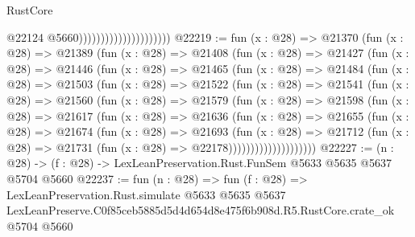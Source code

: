 \begin{lexlean}{RustCore}
\begin{coremodule}
                                              @22124
                                              @5660)))))))))))))))))))))
@22219 := fun (x : @28) =>
  @21370
    (fun (x : @28) =>
    @21389
      (fun (x : @28) =>
      @21408
        (fun (x : @28) =>
        @21427
          (fun (x : @28) =>
          @21446
            (fun (x : @28) =>
            @21465
              (fun (x : @28) =>
              @21484
                (fun (x : @28) =>
                @21503
                  (fun (x : @28) =>
                  @21522
                    (fun (x : @28) =>
                    @21541
                      (fun (x : @28) =>
                      @21560
                        (fun (x : @28) =>
                        @21579
                          (fun (x : @28) =>
                          @21598
                            (fun (x : @28) =>
                            @21617
                              (fun (x : @28) =>
                              @21636
                                (fun (x : @28) =>
                                @21655
                                  (fun (x : @28) =>
                                  @21674
                                    (fun (x : @28) =>
                                    @21693
                                      (fun (x : @28) =>
                                      @21712
                                        (fun (x : @28) =>
                                        @21731 (fun (x : @28) => @22178))))))))))))))))))))
@22227 := (n : @28) -> (f : @28) -> LexLeanPreservation.Rust.FunSem @5633 @5635 @5637 @5704 @5660
@22237 := fun (n : @28) =>
  fun (f : @28) =>
  LexLeanPreservation.Rust.simulate
    @5633
    @5635
    @5637
    LexLeanPreserve.C0f85ceb5885d5d4d654d8e475f6b908d.R5.RustCore.crate_ok
    @5704
    @5660
\end{coremodule}
\end{lexlean}

